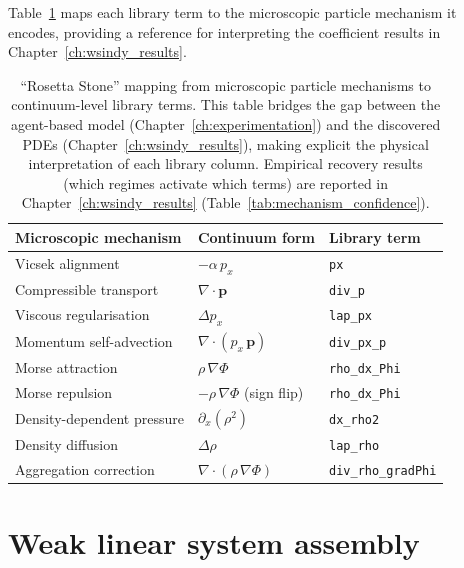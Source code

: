 Table~\ref{tab:rosetta_stone} maps each library term to the
microscopic particle mechanism it encodes, providing a reference
for interpreting the coefficient results in Chapter~\ref{ch:wsindy_results}.

\begin{table}[ht]
\centering
\caption{``Rosetta Stone'' mapping from microscopic particle mechanisms to
continuum-level library terms.  This table bridges the gap between
the agent-based model (Chapter~\ref{ch:experimentation}) and the discovered PDEs
(Chapter~\ref{ch:wsindy_results}), making explicit the physical interpretation of each library
column.  Empirical recovery results (which regimes activate which terms) are
reported in Chapter~\ref{ch:wsindy_results}
(Table~\ref{tab:mechanism_confidence}).}
\label{tab:rosetta_stone}
\renewcommand{\arraystretch}{0.95}
\begin{tabular}{p{3.8cm}p{4.0cm}p{3.0cm}}
\toprule
\textbf{Microscopic mechanism} & \textbf{Continuum form} & \textbf{Library term} \\
\midrule
Vicsek alignment      & $-\alpha\,p_x$          & \texttt{px}             \\
Compressible transport & $\nabla\cdot\mathbf{p}$ & \texttt{div\_p}         \\
Viscous regularisation & $\Delta p_x$            & \texttt{lap\_px}        \\
Momentum self-advection & $\nabla\cdot(p_x\,\mathbf{p})$ & \texttt{div\_px\_p} \\
Morse attraction      & $\rho\,\nabla\Phi$       & \texttt{rho\_dx\_Phi}   \\
Morse repulsion       & $-\rho\,\nabla\Phi$ (sign flip) & \texttt{rho\_dx\_Phi} \\
Density-dependent pressure & $\partial_x(\rho^2)$ & \texttt{dx\_rho2}      \\
Density diffusion     & $\Delta\rho$             & \texttt{lap\_rho}       \\
Aggregation correction & $\nabla\cdot(\rho\,\nabla\Phi)$ & \texttt{div\_rho\_gradPhi} \\
\bottomrule
\end{tabular}
\end{table}

\section{Weak linear system assembly}
\label{sec:weak_system}

